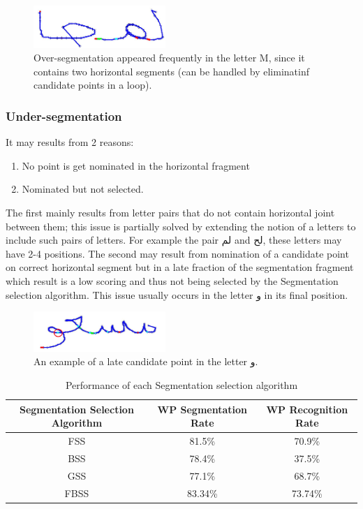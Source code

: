 \documentclass[12pt,journal,compsoc]{IEEEtran}
\begin{document}
\begin{figure}[h]
\centering
\includegraphics[width=5cm]{./figures/oversegmentation_m}
\caption{Over-segmentation appeared frequently in the letter M, since it contains two horizontal segments (can be handled by eliminatinf candidate points in a loop).}
\label{fig:oversegmentation_m}
\end{figure}

\subsubsection{Under-segmentation}
It may results from 2 reasons:

\begin{enumerate}
\item No point is get nominated in the horizontal fragment
\item Nominated but not selected.
\end{enumerate}

The first mainly results from letter pairs that do not contain horizontal joint between them; this issue is partially solved by extending the notion of a letters to include such pairs of letters. For example the pair لم and لح, these letters may have 2-4 positions. The second may result from nomination of a candidate point on correct horizontal segment but in a late fraction of the segmentation fragment which result is a low scoring and thus not being selected by the Segmentation selection algorithm. This issue usually occurs in the letter و in its final position.

\begin{figure}[h]
\centering
\includegraphics[width=5cm]{./figures/undersegmentation_w}
\caption{An example of a late candidate point in the letter و.}
\label{fig:undersegmentation_w}
\end{figure}


\begin{table}[h]
\caption{Performance of each Segmentation selection algorithm}
\begin{tabular}{ | c | c | c | }
Segmentation Selection Algorithm & WP Segmentation Rate & WP Recognition Rate	  \\
\hline                 
  FSS & 81.5\% & 70.9\% \\ 
  \hline
  BSS & 78.4\% &  37.5\% \\ 
 \hline
 GSS & 77.1\% & 68.7\% \\ 
 \hline
  FBSS & 83.34\% & 73.74\% \\
\hline
\end{tabular}
\centering
\label{table:ss_algorithms_results} 
\end{table}
\end{document}
